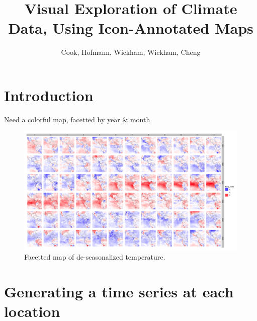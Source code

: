 \documentclass{article}
\begin{document}
\title{Visual Exploration of Climate Data, Using Icon-Annotated Maps}
\author{Cook, Hofmann, Wickham, Wickham, Cheng}




\maketitle

\section{Introduction}

Need a colorful map, facetted by year \& month

\begin{figure}[htp]
\includegraphics[width=6in]{images/nasa-colored-map.png}
\caption{Facetted map of de-seasonalized temperature.}
\end{figure}

\section{Generating a time series at each location}
\end{document}
